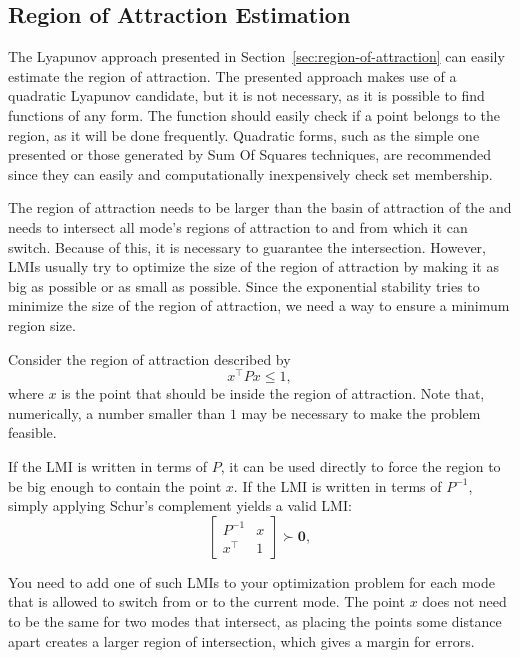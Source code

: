 \subsection{Region of Attraction Estimation}%
\label{subsec:roa-estimation}

The Lyapunov approach presented in Section~\ref{sec:region-of-attraction} can
easily estimate the region of attraction. The presented approach makes use of a
quadratic Lyapunov candidate, but it is not necessary, as it is possible to find
functions of any form. The function should easily check if a point belongs to
the region, as it will be done frequently. Quadratic forms, such as the simple
one presented or those generated by Sum Of Squares techniques, are recommended
since they can easily and computationally inexpensively check set membership.

The region of attraction needs to be larger than the basin of attraction of the
\CG{} and needs to intersect all mode's regions of attraction to and from which
it can switch. Because of this, it is necessary to guarantee the intersection.
However, LMIs usually try to optimize the size of the region of attraction by
making it as big as possible or as small as possible. Since the exponential
stability tries to minimize the size of the region of attraction, we need a way
to ensure a minimum region size.

Consider the region of attraction described by
%
\begin{equation}
  x^{\top}Px \le{} 1,
\end{equation}
%
where \(x\) is the point that should be inside the region of attraction. Note
that, numerically, a number smaller than \(1\) may be necessary to make the
problem feasible.

If the LMI is written in terms of \(P\), it can be used directly to force the
region to be big enough to contain the point \(x\). If the LMI is written in
terms of \(P^{-1}\), simply applying Schur's complement yields a valid LMI:
%
\begin{equation}
  \label{eq:lmi-point-inside-roa}
  \begin{bmatrix}
    P^{-1}   & x \\
    x^{\top} & 1
  \end{bmatrix} \succ \mathbf{0},
\end{equation}

You need to add one of such LMIs to your optimization problem for each mode that
is allowed to switch from or to the current mode. The point \(x\) does not need
to be the same for two modes that intersect, as placing the points some distance
apart creates a larger region of intersection, which gives a margin for errors.

